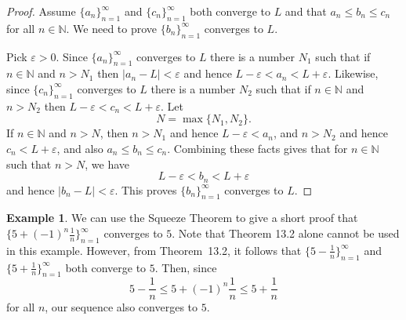 \documentclass[12pt]{amsart}
\def\e{\varepsilon}
\newcommand{\N}{\mathbb{N}}
\numberwithin{equation}{section}
\theoremstyle{plain} %
\newtheorem{cor}[equation]{Corollary}
\theoremstyle{definition}
\newtheorem{ex}[equation]{Example}
\theoremstyle{remark}
\begin{document}
 

\begin{proof}
Assume $\{a_n\}_{n=1}^\infty$ and  $\{c_n\}_{n=1}^\infty$ both
converge to $L$ and that  $a_n \leq b_n \leq c_n$ for all $n \in \N$. 
We need to prove $\{b_n\}_{n=1}^\infty$ converges to $L$.

Pick $\e> 0$.  Since  $\{a_n\}_{n=1}^\infty$ converges to $L$ there is a number $N_1$ such that if $n \in \N$ and $n > N_1$ then
$|a_n - L| < \e$ and hence $L- \e < a_n < L + \e$. Likewise, 
since $\{c_n\}_{n=1}^\infty$ converges to $L$ there is a number $N_2$ such that if $n \in \N$ and $n > N_2$ then
 $L- \e < c_n < L + \e$. Let 
$$
N = \max\{N_1, N_2\}.
$$
 If $n \in \N$ and $n > N$, then
$n > N_1$ and hence $L - \e < a_n$, and $n > N_2$ and hence $c_n < L + \e$, and also
$a_n \leq  b_n \leq  c_n$. Combining these facts gives that for $n \in \N$ such that $n > N$,
we have
$$
L - \e < b_n < L + \e
$$
and hence $|b_n - L| < \e$.
This proves $\{b_n\}_{n=1}^\infty$ converges to $L$. 
\end{proof}


\begin{ex} We can use the Squeeze Theorem to give a short proof that ${\{ 5 + (-1)^n \frac{1}{n} \}_{n=1}^\infty}$ converges to $5$. Note that Theorem 13.2 alone cannot be used in this
  example. However, from Theorem~13.2, it follows that $\{5-\frac{1}{n}\}_{n=1}^\infty$ and  $\{5+\frac{1}{n}\}_{n=1}^\infty$ both converge to $5$. Then, since \[5-\frac{1}{n} \leq  5 + (-1)^n \frac{1}{n} \leq 5+\frac{1}{n}\] for all $n$, our sequence also converges to $5$.\end{ex}







\end{document}
